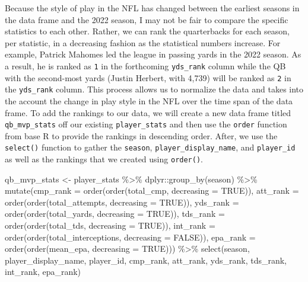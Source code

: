 \documentclass[
  letterpaper,
]{krantz}
\newenvironment{Shaded}{\begin{snugshade}}{\end{snugshade}}
\newcommand{\AttributeTok}[1]{\textcolor[rgb]{0.40,0.45,0.13}{#1}}
\newcommand{\ConstantTok}[1]{\textcolor[rgb]{0.56,0.35,0.01}{#1}}
\newcommand{\FunctionTok}[1]{\textcolor[rgb]{0.28,0.35,0.67}{#1}}
\newcommand{\NormalTok}[1]{\textcolor[rgb]{0.00,0.23,0.31}{#1}}
\newcommand{\OtherTok}[1]{\textcolor[rgb]{0.00,0.23,0.31}{#1}}
\newcommand{\SpecialCharTok}[1]{\textcolor[rgb]{0.37,0.37,0.37}{#1}}
\begin{document}
Because the style of play in the NFL has changed between the earliest
seasons in the data frame and the 2022 season, I may not be fair to
compare the specific statistics to each other. Rather, we can rank the
quarterbacks for each season, per statistic, in a decreasing fashion as
the statistical numbers increase. For example, Patrick Mahomes led the
league in passing yards in the 2022 season. As a result, he is ranked as
\texttt{1} in the forthcoming \texttt{yds\_rank} column while the QB
with the second-most yards (Justin Herbert, with 4,739) will be ranked
as \texttt{2} in the \texttt{yds\_rank} column. This process allows us
to normalize the data and takes into the account the change in play
style in the NFL over the time span of the data frame. To add the
rankings to our data, we will create a new data frame titled
\texttt{qb\_mvp\_stats} off our existing \texttt{player\_stats} and then
use the \texttt{order} function from base R to provide the rankings in
descending order. After, we use the \texttt{select()} function to gather
the \texttt{season}, \texttt{player\_display\_name}, and
\texttt{player\_id} as well as the rankings that we created using
\texttt{order()}.

\begin{Shaded}
\begin{Highlighting}[]
\NormalTok{qb\_mvp\_stats }\OtherTok{\textless{}{-}}\NormalTok{ player\_stats }\SpecialCharTok{\%\textgreater{}\%}
\NormalTok{  dplyr}\SpecialCharTok{::}\FunctionTok{group\_by}\NormalTok{(season) }\SpecialCharTok{\%\textgreater{}\%}
  \FunctionTok{mutate}\NormalTok{(}\AttributeTok{cmp\_rank =} \FunctionTok{order}\NormalTok{(}\FunctionTok{order}\NormalTok{(total\_cmp, }\AttributeTok{decreasing =} \ConstantTok{TRUE}\NormalTok{)),}
         \AttributeTok{att\_rank =} \FunctionTok{order}\NormalTok{(}\FunctionTok{order}\NormalTok{(total\_attempts, }\AttributeTok{decreasing =} \ConstantTok{TRUE}\NormalTok{)),}
         \AttributeTok{yds\_rank =} \FunctionTok{order}\NormalTok{(}\FunctionTok{order}\NormalTok{(total\_yards, }\AttributeTok{decreasing =} \ConstantTok{TRUE}\NormalTok{)),}
         \AttributeTok{tds\_rank =} \FunctionTok{order}\NormalTok{(}\FunctionTok{order}\NormalTok{(total\_tds, }\AttributeTok{decreasing =} \ConstantTok{TRUE}\NormalTok{)),}
         \AttributeTok{int\_rank =} \FunctionTok{order}\NormalTok{(}\FunctionTok{order}\NormalTok{(total\_interceptions, }\AttributeTok{decreasing =} \ConstantTok{FALSE}\NormalTok{)),}
         \AttributeTok{epa\_rank =} \FunctionTok{order}\NormalTok{(}\FunctionTok{order}\NormalTok{(mean\_epa, }\AttributeTok{decreasing =} \ConstantTok{TRUE}\NormalTok{))) }\SpecialCharTok{\%\textgreater{}\%}
  \FunctionTok{select}\NormalTok{(season, player\_display\_name, player\_id, cmp\_rank, att\_rank, yds\_rank, tds\_rank,}
\NormalTok{         int\_rank, epa\_rank)}
\end{Highlighting}
\end{Shaded}
\end{document}
